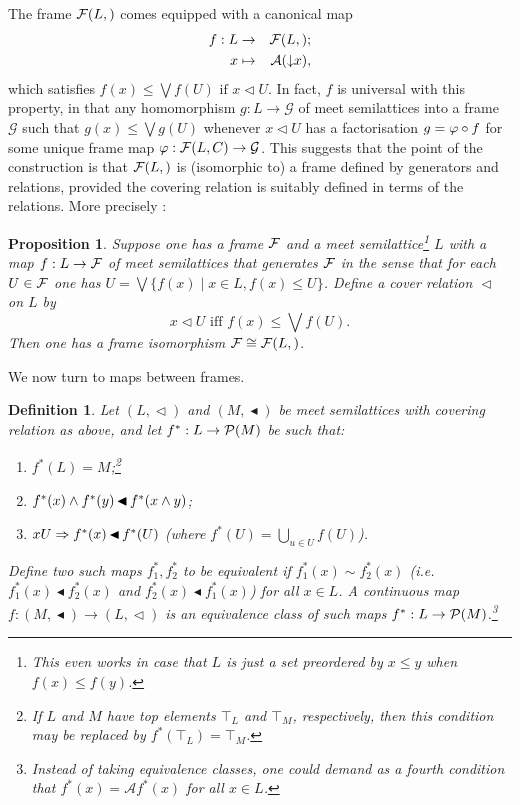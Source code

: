 \documentclass[11pt]{article}
\newcommand{\downset}{\ensuremath{\mathop{\downarrow\!}}}
\newcommand{\drie}{\vartriangleleft}
\newcommand{\coveredd}{\ensuremath{\mathop{\blacktriangleleft}}}
\newcommand{\beq}{\begin{equation}}
\newcommand{\eeq}{\end{equation}}
\newcommand{\raw}{\rightarrow} \newcommand{\rat}{\mapsto}
\newcommand{\ie}{\textit{i.e.}}
\newtheorem{proposition}[theorem]{Proposition}
\newtheorem{definition}[theorem]{Definition}
\begin{document}
 The frame $\CF(L,\drie)$ comes equipped with a canonical map 
 \begin{eqnarray}
 f:L& \raw & \CF(L,\drie) ; \\
  x&\mapsto&  \mathcal{A}(\downset x), \label{canmap}
\end{eqnarray}
which satisfies
 $f(x)\leqslant \bigvee f(U) \mbox{ if } x\drie U$.
 In fact, $f$ is universal with this property, in that any homomorphism $g:L\raw \mathcal{G}$ of meet semilattices into a frame $\mathcal{G}$ such that $g(x)\leqslant \bigvee g(U)$ whenever $x\drie U$
has  a factorisation $g=\varphi\circ f$ for some unique frame map $\phv: \CF(L,C)\raw \mathcal{G}$.
This suggests that the point of the construction is that  $\CF(L,\drie)$ is (isomorphic to)
a frame defined by generators and relations, provided the covering relation is suitably defined in terms 
of the relations. More precisely \cite[Thm.\ 12]{aczel}:
\begin{proposition}\label{preciseprop}
Suppose one has a frame ${\mathcal F}$ and a meet semilattice\footnote{This even works  in case that $L$ is just a set preordered by $x\leqslant y$ when $f(x)\leqslant f(y)$.} $L$ with a map $f:L\raw \CF$ of meet semilattices
that generates ${\mathcal F}$ in the sense that for each $U\in{\mathcal F}$ one has $U=\bigvee\{f(x)\mid x\in L, f(x)\leq U\}$.
Define a cover relation $\drie$ on $L$ by
\beq  x\drie U \mbox{ iff }  f(x)\leqslant \bigvee f(U). \label{unicover}
\eeq
Then one has a frame isomorphism $\CF\cong \CF(L,\drie)$.
\end{proposition}

We now turn to maps between frames.
\begin{definition}\label{def:contmap}
Let $(L,\drie)$ and $(M,\coveredd)$ be meet semilattices with covering relation as above,
and let $f^*:L\raw\CP(M)$ be such that:
\begin{enumerate}
\item $f^*(L)=M$;\footnote{If $L$ and $M$ have top elements $\top_L$ and $\top_M$, respectively, then this condition may be replaced by $f^*(\top_L)=\top_M$.}
\item $f^*(x)\wed f^*(y)\coveredd f^*(x\wed y)$;
\item  $x\drie U\Raw f^*(x)\coveredd f^*(U)$ (where $f^*(U)=\bigcup_{u\in U} f(U)$).
\end{enumerate}
 
Define two such maps $f^*_1, f^*_2$ to be equivalent if $f^*_1(x) \sim f^*_2(x)$ (\ie\ 
$f^*_1(x) \coveredd f^*_2(x)$ and $f^*_2(x) \coveredd f^*_1(x)$)
for all $x \in L$. A
 \textit{continuous map} $f:(M,\coveredd) \raw (L,\drie)$ is an equivalence class of such maps
$f^*:L\raw\CP(M)$.\footnote{
Instead of taking equivalence classes, one could demand as a fourth
condition that $f^*(x) = \mathcal{A}f^*(x)$ for all $x \in L$.}
\end{definition}
\end{document}
